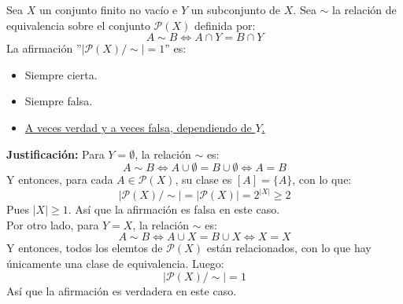 \documentclass[12pt]{article}
\newcounter{ejercicio}[section] %
\newcounter{ejercicio}
\begin{document}
    \begin{ejercicio}
        Sea $X$ un conjunto finito no vacío e $Y$ un subconjunto de $X$. Sea $\sim$ la relación de equivalencia sobre el conjunto $\mathcal{P}(X)$ definida por:
        $$A \sim B \Leftrightarrow A \cap Y = B \cap Y$$
        La afirmación ''$|\mathcal{P}(X)/\sim|=1$'' es:
        \begin{itemize}
            \item Siempre cierta.
            \item Siempre falsa.
            \item \underline{A veces verdad y a veces falsa, dependiendo de $Y$.}
        \end{itemize}
        \textbf{Justificación:}\newline
        Para $Y = \emptyset$, la relación $\sim$ es:
        $$A \sim B \Leftrightarrow A \cup \emptyset = B \cup \emptyset \Leftrightarrow A = B$$
        Y entonces, para cada $A \in \mathcal{P}(X)$, su clase es $[A] = \{A\}$, con lo que:
        $$|\mathcal{P}(X)/\sim| = |\mathcal{P}(X)| = 2^{|X|} \geq 2$$
        Pues $|X| \geq 1$. Así que la afirmación es falsa en este caso.\\

        \noindent
        Por otro lado, para $Y=X$, la relación $\sim$ es:
        $$A \sim B \Leftrightarrow A \cup X = B \cup X \Leftrightarrow X = X$$
        Y entonces, todos los elemtos de $\mathcal{P}(X)$ están relacionados, con lo que hay únicamente una clase de equivalencia. Luego:
        $$|\mathcal{P}(X)/\sim| =1$$
        Así que la afirmación es verdadera en este caso.
    \end{ejercicio}
\end{document}

